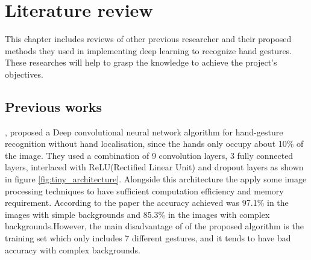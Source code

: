 \documentclass[12pt]{report}
\begin{document}
\chapter{Literature review}

This chapter includes reviews of other previous researcher
and their proposed methods they used in implementing deep learning
to recognize hand gestures. These researches will help to grasp the knowledge
to achieve the project's objectives. 

\section{Previous works}

\cite{Bao2017}, proposed a Deep convolutional neural network algorithm for hand-gesture 
recognition without hand localisation, since the hands only occupy about 10\% of 
the image. They used a combination of 9 convolution layers, 3 fully connected layers, 
interlaced with ReLU(Rectified Linear Unit) and dropout layers as shown in 
figure \ref{fig:tiny_architecture}. Alongside this architecture the apply some image 
processing techniques to have sufficient computation efficiency and memory requirement.
According to the paper the accuracy achieved was 97.1\% in the images with simple backgrounds
and 85.3\% in the images with complex backgrounds.However, the main disadvantage of of 
the proposed algorithm is the training set which only includes 7 different gestures,
and it tends to have bad accuracy with complex backgrounds.
\bigbreak
\end{document}

